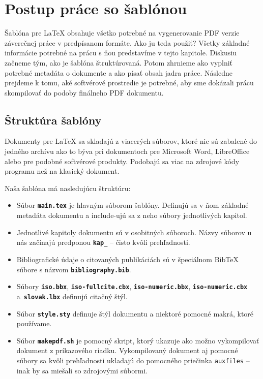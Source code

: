 \chapter{Postup práce so šablónou}

Šablóna pre LaTeX obsahuje všetko potrebné na vygenerovanie PDF verzie záverečnej práce v predpísanom formáte. Ako ju teda použiť? Všetky základné informácie potrebné na prácu s ňou predstavíme v tejto kapitole. Diskusiu začneme tým, ako je šablóna štruktúrovaná. Potom zhrnieme ako vyplniť potrebné metadáta o dokumente a ako písať obsah jadra práce. Následne prejdeme k tomu, aké softvérové prostredie je potrebné, aby sme dokázali prácu skompilovať do podoby finálneho PDF dokumentu.

\section{Štruktúra šablóny}

Dokumenty pre LaTeX sa skladajú z viacerých súborov, ktoré nie sú zabalené do jedného archívu ako to býva pri dokumentoch pre Microsoft Word, LibreOffice alebo pre podobné softvérové produkty. Podobajú sa viac na zdrojové kódy programu než na klasický dokument.

Naša šablóna má nasledujúcu štruktúru:
\begin{itemize}
\item Súbor \textbf{\texttt{main.tex}} je hlavným súborom šablóny. Definujú sa v ňom základné metadáta dokumentu a include-ujú sa z neho súbory jednotlivých kapitol.

\item Jednotlivé kapitoly dokumentu sú v osobitných súboroch. Názvy súborov u nás začínajú predponou \textbf{\texttt{kap\_}} -- čisto kvôli prehľadnosti.

\item Bibliografické údaje o citovaných publikáciách sú v špeciálnom BibTeX súbore s názvom \textbf{\texttt{bibliography.bib}}.

\item Súbory \textbf{\texttt{iso.bbx}}, \textbf{\texttt{iso-fullcite.cbx}}, \textbf{\texttt{iso-numeric.bbx}}, \textbf{\texttt{iso-numeric.cbx}} a\ \textbf{\texttt{slovak.lbx}} definujú citačný štýl.

\item Súbor \textbf{\texttt{style.sty}} definuje štýl dokumentu a niektoré pomocné makrá, ktoré používame.

\item Súbor \textbf{\texttt{makepdf.sh}} je pomocný skript, ktorý ukazuje ako možno vykompilovať dokument z príkazového riadku. Vykompilovaný dokument aj pomocné súbory sa kvôli prehľadnosti ukladajú do pomocného priečinka \texttt{auxfiles} -- inak by sa miešali so zdrojovými súbormi.
\end{itemize}

